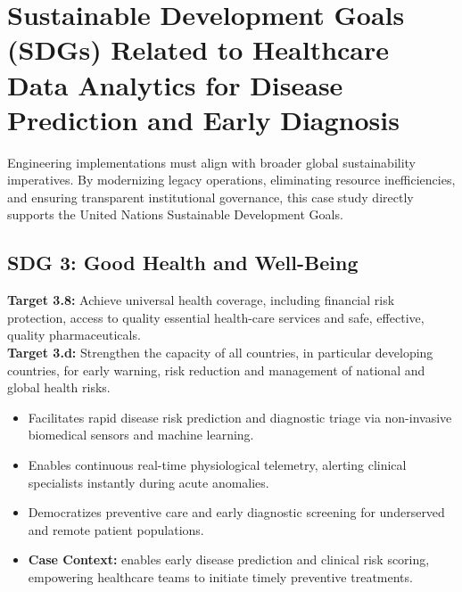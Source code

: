 \section{Sustainable Development Goals (SDGs) Related to Healthcare Data Analytics for Disease Prediction and Early Diagnosis}
Engineering implementations must align with broader global sustainability imperatives. By modernizing legacy operations, eliminating resource inefficiencies, and ensuring transparent institutional governance, this case study directly supports the United Nations Sustainable Development Goals.

\subsection{SDG 3: Good Health and Well-Being}
\noindent\textbf{Target 3.8:} Achieve universal health coverage, including financial risk protection, access to quality essential health-care services and safe, effective, quality pharmaceuticals. \\
\noindent\textbf{Target 3.d:} Strengthen the capacity of all countries, in particular developing countries, for early warning, risk reduction and management of national and global health risks.
\begin{itemize}
  \item Facilitates rapid disease risk prediction and diagnostic triage via non-invasive biomedical sensors and machine learning.
  \item Enables continuous real-time physiological telemetry, alerting clinical specialists instantly during acute anomalies.
  \item Democratizes preventive care and early diagnostic screening for underserved and remote patient populations.
  \item \textbf{Case Context:} enables early disease prediction and clinical risk scoring, empowering healthcare teams to initiate timely preventive treatments.
\end{itemize}

